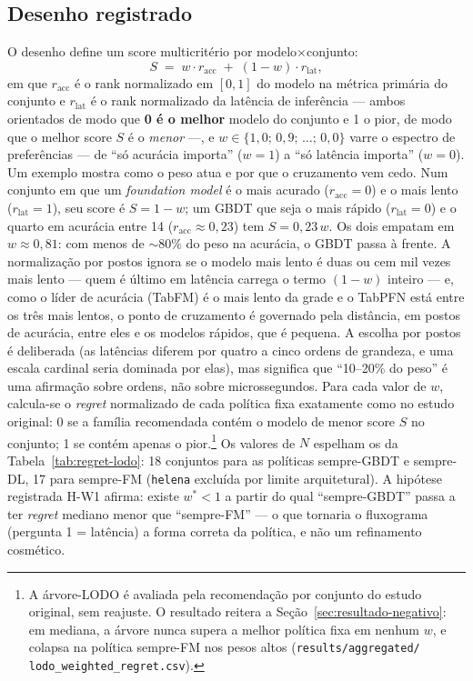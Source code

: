\subsection{Desenho registrado}
\label{sec:e2-desenho}

O desenho define um score multicritério por modelo$\times$conjunto:
\begin{equation}
S \;=\; w \cdot r_{\text{acc}} \;+\; (1-w) \cdot r_{\text{lat}},
\label{eq:score-ponderado}
\end{equation}
em que $r_{\text{acc}}$ é o rank normalizado em $[0,1]$ do modelo na
métrica primária do conjunto e $r_{\text{lat}}$ é o rank normalizado
da latência de inferência --- ambos orientados de modo que \textbf{0 é
o melhor} modelo do conjunto e 1 o pior, de modo que o melhor score
$S$ é o \emph{menor} ---, e
$w \in \{1{,}0;\, 0{,}9;\, \ldots;\, 0{,}0\}$
varre o espectro de preferências --- de ``só acurácia importa''
($w{=}1$) a ``só latência importa'' ($w{=}0$). Um exemplo mostra como
o peso atua e por que o cruzamento vem cedo. Num conjunto em que um
\emph{foundation model} é o mais acurado ($r_{\text{acc}}{=}0$) e o
mais lento ($r_{\text{lat}}{=}1$), seu score é $S = 1-w$; um GBDT que
seja o mais rápido ($r_{\text{lat}}{=}0$) e o quarto em acurácia
entre 14 ($r_{\text{acc}} \approx 0{,}23$) tem $S = 0{,}23\,w$. Os
dois empatam em $w \approx 0{,}81$: com menos de ${\sim}80\%$ do
peso na acurácia, o GBDT passa à frente. A normalização por postos
ignora se o modelo mais lento é duas ou cem mil vezes mais lento ---
quem é último em latência carrega o termo $(1-w)$ inteiro --- e, como
o líder de acurácia (TabFM) é o mais lento da grade e o TabPFN está
entre os três mais lentos,
o ponto de cruzamento é governado pela distância, em postos de
acurácia, entre eles e os modelos rápidos, que é pequena. A escolha
por postos é deliberada (as latências diferem por quatro a cinco
ordens de
grandeza, e uma escala cardinal seria dominada por elas), mas
significa que ``10--20\% do peso'' é uma afirmação sobre ordens, não
sobre microssegundos. Para cada valor de $w$,
calcula-se o \emph{regret} normalizado de cada política fixa exatamente como
no estudo original: 0 se a família recomendada contém o modelo de
menor score $S$ no conjunto; 1 se contém apenas o pior.\footnote{A árvore-LODO é avaliada pela recomendação por conjunto do
estudo original, sem reajuste. O resultado reitera a
Seção~\ref{sec:resultado-negativo}: em mediana, a árvore nunca supera
a melhor política fixa em nenhum $w$, e colapsa na política sempre-FM
nos pesos altos
(\texttt{results/\allowbreak aggregated/\allowbreak
lodo\_\allowbreak weighted\_\allowbreak regret.\allowbreak csv}).}
Os valores de $N$ espelham os da Tabela~\ref{tab:regret-lodo}: 18 conjuntos para
as políticas sempre-GBDT e sempre-DL, 17 para sempre-FM
(\texttt{helena} excluída por limite arquitetural). A hipótese
registrada H-W1 afirma: existe $w^{*} < 1$ a partir do qual
``sempre-GBDT'' passa a ter \emph{regret} mediano menor que ``sempre-FM'' ---
o que tornaria o fluxograma (pergunta 1 = latência) a forma correta da
política, e não um refinamento cosmético.

